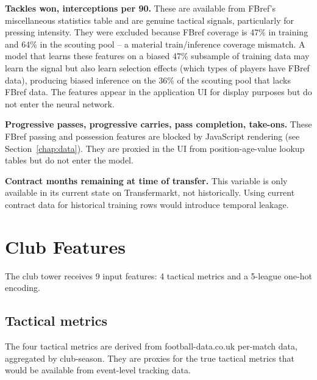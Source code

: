 \documentclass[12pt, a4paper, oneside]{report}
\begin{document}
\textbf{Tackles won, interceptions per 90.} These are available from FBref's miscellaneous statistics table and are genuine tactical signals, particularly for pressing intensity. They were excluded because FBref coverage is 47\% in training and 64\% in the scouting pool -- a material train/inference coverage mismatch. A model that learns these features on a biased 47\% subsample of training data may learn the signal but also learn selection effects (which types of players have FBref data), producing biased inference on the 36\% of the scouting pool that lacks FBref data. The features appear in the application UI for display purposes but do not enter the neural network.

\textbf{Progressive passes, progressive carries, pass completion, take-ons.} These FBref passing and possession features are blocked by JavaScript rendering (see Section~\ref{chap:data}). They are proxied in the UI from position-age-value lookup tables but do not enter the model.

\textbf{Contract months remaining at time of transfer.} This variable is only available in its current state on Transfermarkt, not historically. Using current contract data for historical training rows would introduce temporal leakage.

\section{Club Features}
\label{sec:club_features}

The club tower receives 9 input features: 4 tactical metrics and a 5-league one-hot encoding.

\subsection{Tactical metrics}

The four tactical metrics are derived from football-data.co.uk per-match data, aggregated by club-season. They are proxies for the true tactical metrics that would be available from event-level tracking data.
\end{document}
